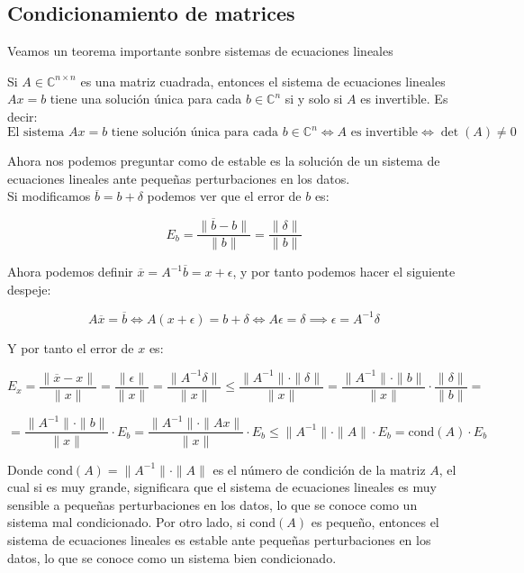 \subsection{Condicionamiento de matrices}

Veamos un teorema importante sonbre sistemas de ecuaciones lineales

\begin{teorema}
    Si $ A \in \mathbb{C}^{n \times n} $ es una matriz cuadrada, entonces el sistema de ecuaciones lineales $ Ax = b $ tiene una solución única para cada $ b \in \mathbb{C}^n $ si y solo si $ A $ es invertible. Es decir:
    \[
        \text{El sistema } Ax = b \text{ tiene solución única para cada } b \in \mathbb{C}^n \iff
        A \text{ es invertible} \iff \det(A) \neq 0
    \]
\end{teorema}

Ahora nos podemos preguntar como de estable es la solución de un sistema de ecuaciones lineales ante pequeñas perturbaciones en los datos.\\

Si modificamos $\overline{b} = b + \delta$ podemos ver que el error de $b$ es:

\[
    E_b = \frac{\| \overline{b} - b \|}{\|b\|} =
    \frac{\|\delta\|}{\|b\|}
\]

Ahora podemos definir $\overline{x} = A^{-1} \overline{b} = x + \epsilon$, y por tanto podemos hacer el siguiente despeje:

\[
    A \overline{x} = \overline{b} \iff
    A (x + \epsilon) = b + \delta \iff
    A \epsilon = \delta \implies
    \epsilon = A^{-1} \delta
\]

Y por tanto el error de $x$ es:

\[
    E_x = \frac{\| \overline{x} - x \|}{\|x\|} =
    \frac{\|\epsilon\|}{\|x\|} =
    \frac{\|A^{-1} \delta\|}{\|x\|} \leq
    \frac{\|A^{-1}\| \cdot \|\delta\|}{\|x\|} =
    \frac{\|A^{-1}\| \cdot \|b\|}{\|x\|} \cdot \frac{\|\delta\|}{\|b\|} =
\]

\[
    = \frac{\|A^{-1}\| \cdot \|b\|}{\|x\|} \cdot E_b =
    \frac{\|A^{-1}\| \cdot \|Ax\|}{\|x\|} \cdot E_b \leq
    \|A^{-1}\| \cdot \|A\| \cdot E_b =
    \text{cond}(A) \cdot E_b
\]

Donde $ \text{cond}(A) = \|A^{-1}\| \cdot \|A\| $ es el número de condición de la matriz $ A $, el cual si es muy grande, significara que el sistema de ecuaciones lineales es muy sensible a pequeñas perturbaciones en los datos, lo que se conoce como un sistema mal condicionado. Por otro lado, si $ \text{cond}(A) $ es pequeño, entonces el sistema de ecuaciones lineales es estable ante pequeñas perturbaciones en los datos, lo que se conoce como un sistema bien condicionado.\\